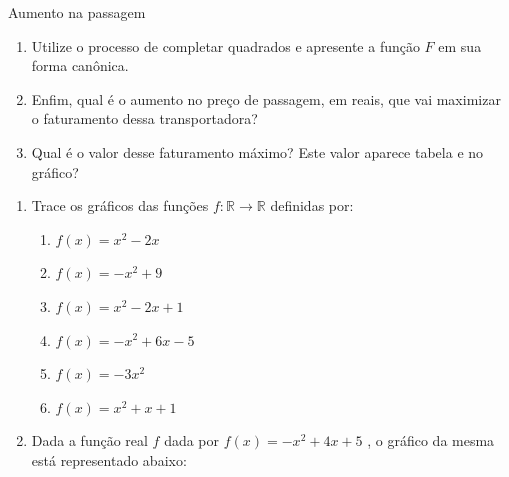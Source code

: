 \begin{task}{Aumento na passagem}
\begin{enumerate}
\item {} 
Utilize o processo de completar quadrados  e apresente a função \(F\) em sua forma canônica.

\item {} 
Enfim, qual é o aumento no preço de passagem, em reais, que vai maximizar o faturamento dessa transportadora?

\item {} 
Qual é o valor desse faturamento máximo? Este valor aparece tabela e no gráfico?

\end{enumerate}
\end{task}


\exercise


\begin{enumerate}

\item Trace os gráficos das funções \(f:\mathbb{R}\to\mathbb{R}\) definidas por:
\begin{enumerate}
\item {} 
\(f(x)=x^2-2x\)

\item {} 
\(f(x)=-x^2+9\)

\item {} 
\(f(x)=x^2-2x+1\)

\item {} 
\(f(x)=-x^2+6x-5\)

\item {} 
\(f(x)=-3x^2\)

\item {} 
\(f(x)=x^2+x+1\)

\end{enumerate}

\item Dada a função real \(f\) dada por \(f(x)=-x^2+4x+5\) , o gráfico da mesma está representado abaixo:
\begin{figure}[H]
\centering

\end{figure}


\end{enumerate}
